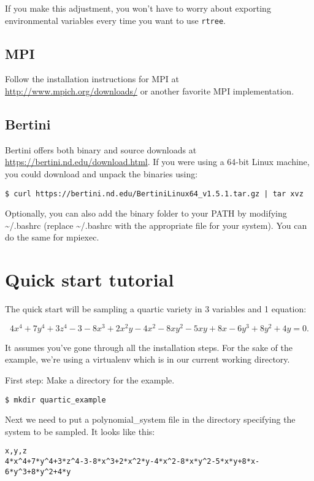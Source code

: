 \documentclass[11pt]{article}
\begin{document}
If you make this adjustment, you won't have to worry about exporting environmental variables every time you want to use \texttt{rtree}.

\subsection{MPI} 
Follow the installation instructions for MPI at \url{http://www.mpich.org/downloads/} or another favorite MPI implementation. 

\subsection{Bertini} 
Bertini offers both binary and source downloads at \url{https://bertini.nd.edu/download.html}. If you were using a 64-bit Linux machine, you could download and unpack the binaries using: 

\begin{verbatim} 
$ curl https://bertini.nd.edu/BertiniLinux64_v1.5.1.tar.gz | tar xvz
\end{verbatim} 

Optionally, you can also add the binary folder to your PATH by modifying \textasciitilde /.bashrc (replace \textasciitilde /.bashrc with the appropriate file for your system). You can do the same for mpiexec. 


\section{Quick start tutorial} 
The quick start will be sampling a quartic variety in 3 variables and 1 equation:

\[
4x^4+7y^4+3z^4-3-8x^3+2x^2y-4x^2-8xy^2-5xy+8x-6y^3+8y^2+4y = 0\text{.} 
\]

It assumes you've gone through all the installation steps. For the sake of the example, we're using a virtualenv which is in our current working directory. 

First step: Make a directory for the example. 

\begin{verbatim} 
$ mkdir quartic_example
\end{verbatim} 

Next we need to put a polynomial\_system file in the directory specifying the system to be 
sampled. It looks like this: 

\begin{verbatim}
x,y,z
4*x^4+7*y^4+3*z^4-3-8*x^3+2*x^2*y-4*x^2-8*x*y^2-5*x*y+8*x-6*y^3+8*y^2+4*y
\end{verbatim} 
\end{document}
